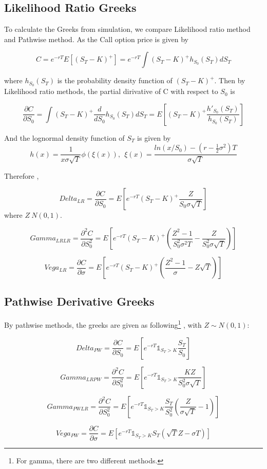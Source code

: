 \documentclass[11pt,a4paper,fleqn]{article}
\begin{document}
\subsection{Likelihood Ratio Greeks}
To calculate the Greeks from simulation, we compare Likelihood ratio method and Pathwise method. As the Call option price is given by

$$C = e^{-rT}E[(S_T-K)^+]=e^{-rT}\int(S_T-K)^+ h_{S_0}(S_T) dS_T$$

where $ h_{S_0}(S_T)$ is the probability density function of $(S_T-K)^+$. Then by Likelihood ratio methods, the partial dirivative of C with respect to $S_0$ is

$$\frac{\partial C}{\partial S_0}=\int(S_T-K)^+\frac{d}{dS_0}h_{S_0}(S_T) dS_T=E[(S_T-K)^+\frac{h'_{S_0}(S_T)}{h_{S_0}(S_T)}] $$

And the lognormal density function of $S_T$ is given by
$$h(x)=\frac{1}{x\sigma \sqrt{T}}\phi(\xi(x)), \ \ \xi(x)=\frac{ln(x/S_0)-(r-\frac{1}{2}\sigma^2)T}{\sigma \sqrt{T}}  $$

Therefore \cite{lectures},

$$Delta_{LR}=\frac{\partial C}{\partial S_0}=E[e^{-rT}(S_T-K)^+\frac{Z}{S_0\sigma\sqrt{T}}]$$
where $Z~N(0,1).$

$$Gamma_{LR LR} = \frac{\partial^2 C}{\partial  S_0^2 }=E[e^{-rT}(S_T-K)^+(\frac{Z^2-1}{S_0^2\sigma^2 T } - \frac{Z}{S_0^2 \sigma \sqrt{T}})]$$

$$Vega_{LR} = \frac{\partial C}{\partial \sigma}=E[e^{-rT}(S_T-K)^+\left(\frac{Z^2-1}{\sigma}-Z\sqrt{T}\right)]$$

\subsection{Pathwise Derivative Greeks}
By pathwise methods, the greeks are given as following\footnote{For gamma, there are two different methods.} \cite{lectures}, with $Z\sim N(0,1)$:

$$Delta_{PW}=\frac{\partial C}{\partial S_0}=E[e^{-rT}\mathds{1}_{S_T>K}\frac{S_T}{S_0}]$$

$$Gamma_{LRPW} = \frac{\partial^2 C}{\partial  S_0^2 }=E[e^{-rT}\mathds{1}_{S_T>K}\frac{KZ}{S_0^2\sigma\sqrt{T}}]$$

$$Gamma_{PWLR} = \frac{\partial^2 C}{\partial  S_0^2 }=E[e^{-rT}\mathds{1}_{S_T>K}\frac{S_T}{S_0^2}\left(\frac{Z}{\sigma\sqrt{T}}-1\right)]$$

$$Vega_{PW} = \frac{\partial C}{\partial \sigma}=E[e^{-rT}\mathds{1}_{S_T>K}S_T(\sqrt{T}Z-\sigma T)]$$
\end{document}
